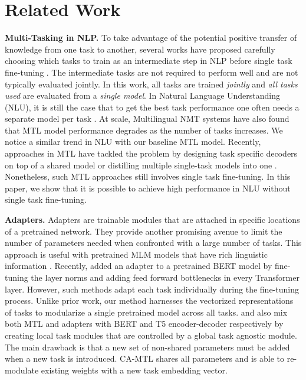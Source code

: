 \documentclass{article} \usepackage{iclr2021_conference,times}
\begin{document}
\vspace{-10pt}
\section{Related Work}
\vspace{-5pt}
\textbf{Multi-Tasking in NLP.}
To take advantage of the potential positive transfer of knowledge from one task to another, several works have proposed carefully choosing which tasks to train as an intermediate step in NLP before single task fine-tuning \citep{bingel-sogaard-2017-identifying,kerinec-etal-2018-deep,wang-acl-19,DBLP:journals/corr/abs-1905-07553,pruksachatkun2020intermediate,DBLP:journals/corr/abs-1811-01088}. The intermediate tasks are not required to perform well and are not typically evaluated jointly. In this work, all tasks are trained \emph{jointly} and \emph{all tasks used} are evaluated from a \emph{single model}. In Natural Language Understanding (NLU), it is still the case that to get the best task performance one often needs a separate model per task \citep{mtl_bert_clark2019,mccann2018natural}.
At scale, Multilingual NMT systems \citep{aharoni-etal-2019-massively} have also found that MTL model performance degrades as the number of tasks increases. We notice a similar trend in NLU with our baseline MTL model.
Recently, approaches in MTL have tackled the problem by designing task specific decoders on top of a shared model \citep{mtl_bert_liu2019} or distilling multiple single-task models into one \citep{mtl_bert_clark2019}. Nonetheless, such MTL approaches still involves single task fine-tuning. In this paper, we show that it is possible to achieve high performance in NLU without single task fine-tuning. 



\textbf{Adapters.}
Adapters are  trainable modules that are attached in specific locations of a pretrained network. They provide another promising avenue to limit the number of parameters needed when confronted with a large number of tasks. This approach is useful with pretrained MLM models that have rich linguistic information  \citep{context_prob,bert_analysis,trans_context,bert_classicnlp}.  Recently, \citet{DBLP:journals/corr/abs-1902-00751} added an adapter to a pretrained BERT model by fine-tuning the layer norms and adding feed forward bottlenecks in every Transformer layer. 
However, such methods adapt each task individually during the fine-tuning process. Unlike prior work, our method harnesses the vectorized representations of tasks to modularize a single pretrained model across all tasks. \citet{pmlr-v97-stickland19a} and \citet{tay2020hypergrid} also mix both MTL and adapters with BERT and T5 encoder-decoder \citep{t5} respectively by creating local task modules that are controlled by a global task agnostic module. The main drawback is that a new set of non-shared parameters must be added when a new task is introduced. CA-MTL shares all parameters and is able to re-modulate existing weights with a new task embedding vector.
\end{document}
